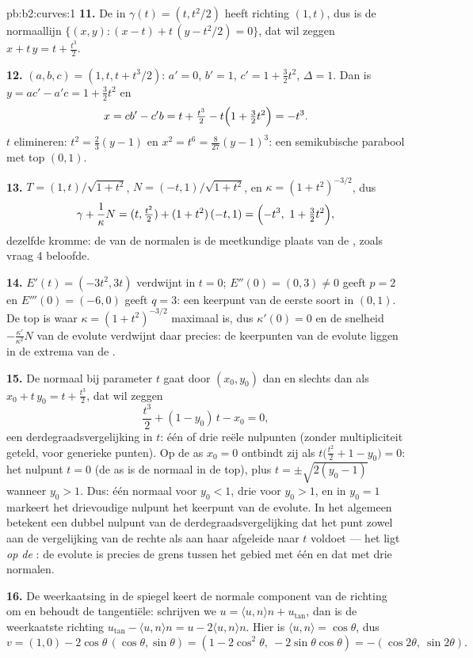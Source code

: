 \begin{solution}{pb:b2:curves:1}
\textbf{11.} De  in $\gamma(t) = (t, t^2/2)$ heeft richting
$(1, t)$, dus is de normaallijn $\{(x, y) : (x - t) + t\,(y -
t^2/2) = 0\}$, dat wil zeggen $x + t\,y = t + \tfrac{t^3}2$.

\textbf{12.} $(a, b, c) = (1, t, t + t^3/2)$: $a' = 0$, $b' = 1$,
$c' = 1 + \tfrac32 t^2$, $\Delta = 1$. Dan is $y = ac' - a'c = 1 +
\tfrac32t^2$ en
\[
x = cb' - c'b = t + \tfrac{t^3}2 - t\Bigl(1 +
\tfrac32t^2\Bigr) = -t^3 .
\]
$t$ elimineren: $t^2 = \tfrac23(y - 1)$ en $x^2 = t^6 =
\tfrac8{27}(y - 1)^3$: een semikubische parabool met top $(0, 1)$.

\textbf{13.} $T = (1, t)/\sqrt{1+t^2}$, $N = (-t,
1)/\sqrt{1+t^2}$, en $\kappa = (1+t^2)^{-3/2}$, dus
\[
\gamma + \frac1\kappa N = (t, \tfrac{t^2}2) +
(1+t^2)\,(-t, 1) = \Bigl(-t^3,\ 1 + \tfrac32t^2\Bigr),
\]
dezelfde kromme: de  van de normalen is de meetkundige
plaats van de , zoals vraag 4 beloofde.

\textbf{14.} $E'(t) = (-3t^2, 3t)$ verdwijnt in $t = 0$; $E''(0) =
(0, 3) \neq 0$ geeft $p = 2$ en $E'''(0) = (-6, 0)$ geeft $q = 3$:
een keerpunt van de eerste soort in $(0, 1)$. De top is waar
$\kappa = (1+t^2)^{-3/2}$ maximaal is, dus $\kappa'(0) = 0$ en de
snelheid $-\frac{\kappa'}{\kappa^2}N$ van de evolute verdwijnt daar
precies: de keerpunten van de evolute liggen in de extrema van de
.

\textbf{15.} De normaal bij parameter $t$ gaat door $(x_0, y_0)$
dan en slechts dan als $x_0 + t\,y_0 = t + \tfrac{t^3}2$, dat wil
zeggen
\[
\frac{t^3}2 + (1 - y_0)\,t - x_0 = 0 ,
\]
een derdegraadsvergelijking in $t$: één of drie reële nulpunten
(zonder multipliciteit geteld, voor generieke punten). Op de as
$x_0 = 0$ ontbindt zij als $t\bigl(\tfrac{t^2}2 + 1 - y_0\bigr) =
0$: het nulpunt $t = 0$ (de as is de normaal in de top), plus $t =
\pm\sqrt{2(y_0 - 1)}$ wanneer $y_0 > 1$. Dus: één normaal voor $y_0
< 1$, drie voor $y_0 > 1$, en in $y_0 = 1$ markeert het drievoudige
nulpunt het keerpunt van de evolute. In het algemeen betekent een
dubbel nulpunt van de derdegraadsvergelijking dat het punt zowel
aan de vergelijking van de rechte als aan haar afgeleide naar $t$
voldoet --- het ligt \emph{op de }: de evolute is precies
de grens tussen het gebied met één en dat met drie normalen.

\textbf{16.} De weerkaatsing in de spiegel keert de normale
component van de richting om en behoudt de tangentiële: schrijven
we $u = \langle u, n\rangle n + u_{\mathrm{tan}}$, dan is de
weerkaatste richting $u_{\mathrm{tan}} - \langle u, n\rangle n = u
- 2\langle u, n\rangle n$. Hier is $\langle u, n\rangle =
\cos\theta$, dus
\[
v = (1, 0) - 2\cos\theta\,(\cos\theta, \sin\theta)
= (1 - 2\cos^2\theta,\ -2\sin\theta\cos\theta)
= -(\cos2\theta,\ \sin2\theta).
\]


\end{solution}
